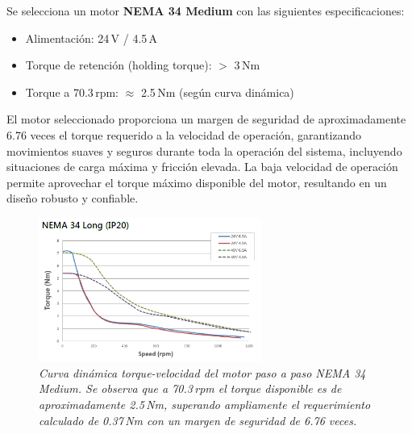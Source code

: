 Se selecciona un motor \textbf{NEMA 34 Medium} con las siguientes especificaciones:
\begin{itemize}[label=$\bullet$]
    \item Alimentación: 24\,V / 4.5\,A
    \item Torque de retención (holding torque): $>$ 3\,Nm
    \item Torque a 70.3\,rpm: $\approx$ 2.5\,Nm (según curva dinámica)
\end{itemize}

El motor seleccionado proporciona un margen de seguridad de aproximadamente 6.76 veces el torque requerido a la velocidad de operación, garantizando movimientos suaves y seguros durante toda la operación del sistema, incluyendo situaciones de carga máxima y fricción elevada. La baja velocidad de operación permite aprovechar el torque máximo disponible del motor, resultando en un diseño robusto y confiable.

\begin{figure}[H]
    \centering
    \includegraphics[width=0.65\textwidth]{img/Nema34.png}
    \caption{\textit{Curva dinámica torque-velocidad del motor paso a paso NEMA 34 Medium. Se observa que a 70.3\,rpm el torque disponible es de aproximadamente 2.5\,Nm, superando ampliamente el requerimiento calculado de 0.37\,Nm con un margen de seguridad de 6.76 veces.}}
    \label{fig:Curva_din_nema34}
\end{figure}